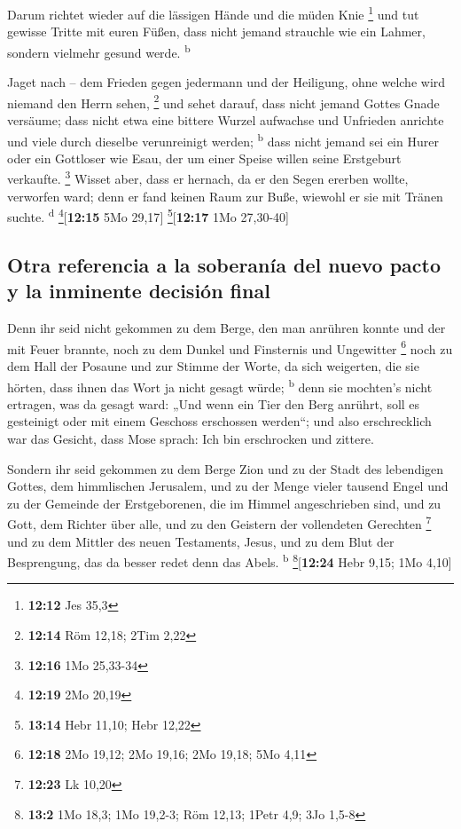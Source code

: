  Darum richtet wieder auf die lässigen Hände und die
müden Knie \footnote{\textbf{12:12} Jes 35,3}  und tut
gewisse Tritte mit euren Füßen, dass nicht jemand strauchle wie ein
Lahmer, sondern vielmehr gesund werde. \textsuperscript{b}

 Jaget nach -- dem Frieden gegen jedermann und der
Heiligung, ohne welche wird niemand den Herrn sehen, \footnote{\textbf{12:14}
  Röm 12,18; 2Tim 2,22}  und sehet darauf, dass nicht
jemand Gottes Gnade versäume; dass nicht etwa eine bittere Wurzel
aufwachse und Unfrieden anrichte und viele durch dieselbe verunreinigt
werden; \textsuperscript{b}  dass nicht jemand sei ein
Hurer oder ein Gottloser wie Esau, der um einer Speise willen seine
Erstgeburt verkaufte. \footnote{\textbf{12:16} 1Mo 25,33-34}
 Wisset aber, dass er hernach, da er den Segen ererben
wollte, verworfen ward; denn er fand keinen Raum zur Buße, wiewohl er
sie mit Tränen suchte. \textsuperscript{d} \footnote{\textbf{12:19} 2Mo
  20,19}{[}\textbf{12:15} 5Mo 29,17{]} \footnote{\textbf{13:14} Hebr
  11,10; Hebr 12,22}{[}\textbf{12:17} 1Mo 27,30-40{]}

\hypertarget{otra-referencia-a-la-soberanuxeda-del-nuevo-pacto-y-la-inminente-decisiuxf3n-final}{%
\subsection{Otra referencia a la soberanía del nuevo pacto y la
inminente decisión
final}\label{otra-referencia-a-la-soberanuxeda-del-nuevo-pacto-y-la-inminente-decisiuxf3n-final}}

 Denn ihr seid nicht gekommen zu dem Berge, den man
anrühren konnte und der mit Feuer brannte, noch zu dem Dunkel und
Finsternis und Ungewitter \footnote{\textbf{12:18} 2Mo 19,12; 2Mo 19,16;
  2Mo 19,18; 5Mo 4,11}  noch zu dem Hall der Posaune und
zur Stimme der Worte, da sich weigerten, die sie hörten, dass ihnen das
Wort ja nicht gesagt würde; \textsuperscript{b}  denn sie
mochten's nicht ertragen, was da gesagt ward: „Und wenn ein Tier den
Berg anrührt, soll es gesteinigt oder mit einem Geschoss erschossen
werden``;  und also erschrecklich war das Gesicht, dass
Mose sprach: Ich bin erschrocken und zittere.

 Sondern ihr seid gekommen zu dem Berge Zion und zu der
Stadt des lebendigen Gottes, dem himmlischen Jerusalem, und zu der Menge
vieler tausend Engel  und zu der Gemeinde der
Erstgeborenen, die im Himmel angeschrieben sind, und zu Gott, dem
Richter über alle, und zu den Geistern der vollendeten Gerechten
\footnote{\textbf{12:23} Lk 10,20}  und zu dem Mittler
des neuen Testaments, Jesus, und zu dem Blut der Besprengung, das da
besser redet denn das Abels. \textsuperscript{b}
\footnote{\textbf{13:2} 1Mo 18,3; 1Mo 19,2-3; Röm 12,13; 1Petr 4,9; 3Jo
  1,5-8}{[}\textbf{12:24} Hebr 9,15; 1Mo 4,10{]}

